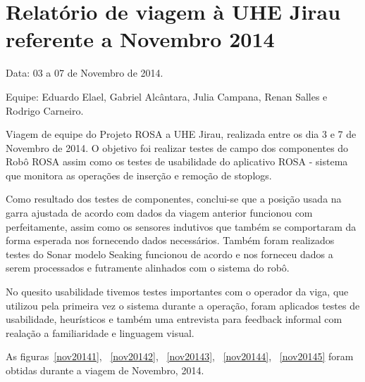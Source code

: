 \section{Relatório de viagem à UHE Jirau
referente a Novembro 2014}
Data: 03 a 07 de Novembro de 2014.

Equipe: Eduardo Elael, Gabriel Alcântara, Julia Campana, Renan Salles e Rodrigo Carneiro.


Viagem de equipe do Projeto ROSA a UHE Jirau, realizada entre
os dia 3 e 7 de Novembro de 2014. O objetivo foi realizar testes de campo dos
componentes do Robô ROSA assim como os testes de usabilidade do aplicativo ROSA
- sistema que monitora as operações de inserção e remoção de stoplogs.

Como resultado dos testes de componentes, conclui-se que a posição usada na
garra ajustada de acordo com dados da viagem anterior funcionou com
perfeitamente, assim como  os sensores indutivos que também se comportaram da
forma esperada nos fornecendo dados necessários.  Também foram realizados
testes do Sonar modelo Seaking funcionou de acordo e nos forneceu dados a serem
processados e futramente alinhados com o sistema do robô.

No quesito usabilidade tivemos testes importantes com o operador da viga, que
utilizou pela primeira vez o sistema durante a operação, foram aplicados
testes de usabilidade, heurísticos e também uma entrevista para feedback
informal com realação a familiaridade e linguagem visual.

As figuras~\ref{nov20141}, ~\ref{nov20142}, ~\ref{nov20143}, ~\ref{nov20144},
~\ref{nov20145} foram obtidas durante a viagem de Novembro, 2014.


